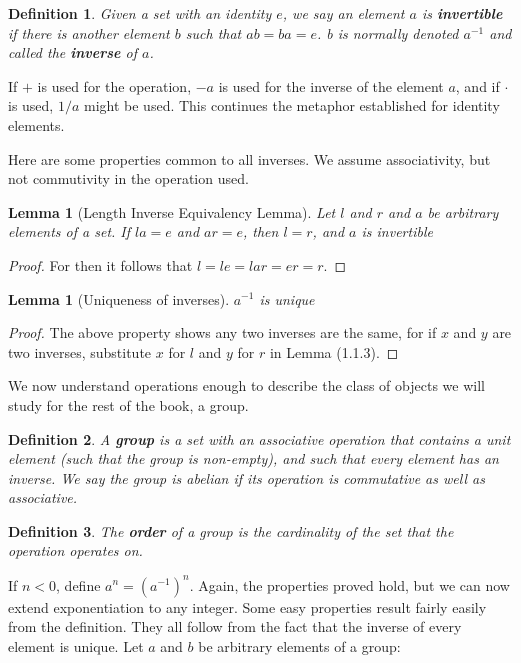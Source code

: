 \documentclass[12pt]{report}
\newtheorem{lemma}[theorem]{Lemma}
\newtheorem{definition}{Definition}
\begin{document}
\begin{definition}
    Given a set with an identity $e$, we say an element $a$ is {\bf invertible} if there is another element $b$ such that $ab = ba = e$. b is normally denoted $a^{-1}$ and called the {\bf inverse} of $a$.
\end{definition}

If $+$ is used for the operation, $-a$ is used for the inverse of the element $a$, and if $\cdotp$ is used, $1/a$ might be used. This continues the metaphor established for identity elements.

Here are some properties common to all inverses. We assume associativity, but not commutivity in the operation used.

\begin{lemma}[Length Inverse Equivalency Lemma] Let $l$ and $r$ and $a$ be arbitrary elements of a set. If $la = e$ and $ar = e$, then $l = r$, and $a$ is invertible \end{lemma}
\begin{proof} For then it follows that $l = le = lar = er = r$. \end{proof}

\begin{lemma}[Uniqueness of inverses] $a^{-1}$ is unique \end{lemma}
\begin{proof} The above property shows any two inverses are the same, for if $x$ and $y$ are two inverses, substitute $x$ for $l$ and $y$ for $r$ in Lemma (1.1.3). \end{proof}

We now understand operations enough to describe the class of objects we will study for the rest of the book, a group.

\begin{definition}
    A {\bf group} is a set with an associative operation that contains a unit element (such that the group is non-empty), and such that every element has an inverse. We say the group is abelian if its operation is commutative as well as associative.
\end{definition}

\begin{definition}
    The {\bf order} of a group is the cardinality of the set that the operation operates on.
\end{definition}

If $n < 0$, define $a^n = (a^{-1})^{n}$. Again, the properties proved hold, but we can now extend exponentiation to any integer. Some easy properties result fairly easily from the definition. They all follow from the fact that the inverse of every element is unique. Let $a$ and $b$ be arbitrary elements of a group:
\end{document}
